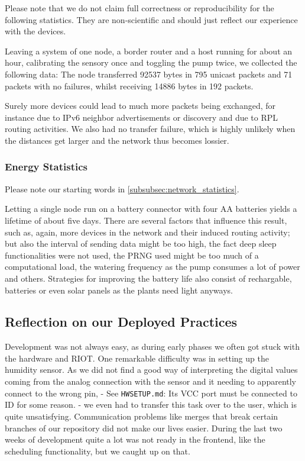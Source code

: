 \documentclass[acmtog, language=english, nonacm]{acmart}
\begin{document}
    Please note that we do not claim full correctness or reproducibility for the following statistics. They are non-scientific and should just reflect our experience with the devices.

    Leaving a system of one node, a border router and a host running for about an hour, calibrating the sensory once and toggling the pump twice, we collected the following data: The node transferred 92537 bytes in 795 unicast packets and 71 packets with no failures, whilst receiving 14886 bytes in 192 packets.

    Surely more devices could lead to much more packets being exchanged, for instance due to IPv6 neighbor advertisements or discovery and due to RPL routing activities. We also had no transfer failure, which is highly unlikely when the distances get larger and the network thus becomes lossier.

    \subsubsection{Energy Statistics}

    Please note our starting words in \cref{subsubsec:network_statistics}.

    Letting a single node run on a battery connector with four AA batteries yields a lifetime of about five days. There are several factors that influence this result, such as, again, more devices in the network and their induced routing activity; but also the interval of sending data might be too high, the fact deep sleep functionalities were not used, the PRNG used might be too much of a computational load, the watering frequency as the pump consumes a lot of power and others. Strategies for improving the battery life also consist of rechargable, batteries or even solar panels as the plants need light anyways.

    \subsection{Reflection on our Deployed Practices}

    Development was not always easy, as during early phases we often got stuck with the hardware and RIOT. One remarkable difficulty was in setting up the humidity sensor. As we did not find a good way of interpreting the digital values coming from the analog connection with the sensor and it needing to apparently connect to the wrong pin, - See \texttt{HWSETUP.md}: Its VCC port must be connected to ID for some reason. - we even had to transfer this task over to the user, which is quite unsatisfying. Communication problems like merges that break certain branches of our repository did not make our lives easier. During the last two weeks of development quite a lot was not ready in the frontend, like the scheduling functionality, but we caught up on that.
\end{document}

